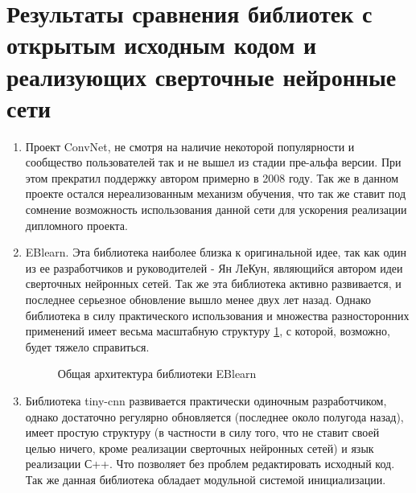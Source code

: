 \documentclass[utf8,usehyperref,14pt]{G7-32}
\begin{document}
\section{Результаты сравнения библиотек с открытым исходным кодом и реализующих сверточные нейронные сети}
\begin{enumerate}
\item Проект ConvNet, не смотря на наличие некоторой популярности и сообщество пользователей так и не вышел из стадии пре-альфа версии. При этом прекратил поддержку автором примерно в 2008 году. Так же в данном проекте остался нереализованным механизм обучения, что так же ставит под сомнение возможность использования данной сети для ускорения реализации дипломного проекта.
\item EBlearn. Эта библиотека наиболее близка к оригинальной идее, так как один из ее разработчиков и руководителей - Ян ЛеКун, являющийся автором идеи сверточных нейронных сетей. Так же эта библиотека активно развивается, и последнее серьезное обновление вышло менее двух лет назад. Однако библиотека в силу практического использования и множества разносторонних применений имеет весьма масштабную структуру \ref{eblearn}, с которой, возможно, будет тяжело справиться.
\begin{figure}[h]
  \caption{Общая архитектура библиотеки EBlearn}\label{eblearn}
\end{figure}
\item Библиотека tiny-cnn развивается практически одиночным разработчиком, однако достаточно регулярно обновляется (последнее около полугода назад), имеет простую структуру (в частности в силу того, что не ставит своей целью ничего, кроме реализации сверточных нейронных сетей) и язык реализации С++. Что позволяет без проблем редактировать исходный код. Так же данная библиотека обладает модульной системой инициализации.

\end{enumerate}
\end{document}
